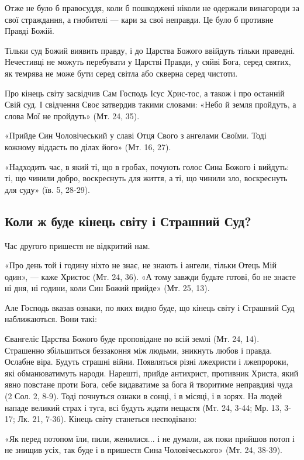 \documentclass[main.tex]{subfiles}
\begin{document}
Отже не було б правосуддя, коли б пошкоджені ніколи не одержали винагороди за свої страждання, а гнобителі — кари за свої неправди. Це було б противне Правді Божій.

Тільки суд Божий виявить правду, і до Царства Божого ввійдуть тільки праведні. Нечестивці не можуть перебувати у Царстві Правди, у сяйві Бога, серед святих, як темрява не може бути серед світла або скверна серед чистоти.

Про кінець світу засвідчив Сам Господь Ісус Хрис-тос, а також і про останній Свій суд. І свідчення Своє затвердив такими словами: «Небо й земля пройдуть, а слова Мої не пройдуть» (Мт. 24, 35).

«Прийде Син Чоловічеський у славі Отця Свого з ангелами Своїми. Тоді кожному віддасть по ділах його» (Мт. 16, 27).

«Надходить час, в який ті, що в гробах, почують голос Сина Божого і вийдуть: ті, що чинили добро, воскреснуть для життя, а ті, що чинили зло, воскреснуть для суду» (їв. 5, 28-29).

\subsection{Коли ж буде кінець світу і Страшний Суд?}

Час другого пришестя не відкритий нам.

«Про день той і годину ніхто не знає, не знають і ангели, тільки Отець Мій один», — каже Христос (Мт. 24, 36). «А тому завжди будьте готові, бо не знаєте ні дня, ні години, коли Син Божий прийде» (Мт. 25, 13).

Але Господь вказав ознаки, по яких видно буде, що кінець світу і Страшний Суд наближаються. Вони такі:

Євангеліє Царства Божого буде проповідане по всій землі (Мт. 24, 14). Страшенно збільшиться беззаконня між людьми, зникнуть любов і правда. Ослабне віра. Будуть страшні війни. Появляться різні лжехристи і лжепророки, які обманюватимуть народи. Нарешті, прийде антихрист, противник Христа, який явно повстане проти Бога, себе видаватиме за бога й творитиме неправдиві чуда (2 Сол. 2, 8-9). Тоді почнуться ознаки в сонці, і в місяці, і в зорях. На людей нападе великий страх і туга, всі будуть ждати нещастя (Мт. 24, 3-44; Мр. 13, 3-17; Лк. 21, 7-36).
Кінець світу станеться несподівано:

«Як перед потопом їли, пили, женилися... і не думали, аж поки прийшов потоп і не знищив усіх, так буде і в пришестя Сина Чоловічеського» (Мт. 24, 38-39).
\end{document}

